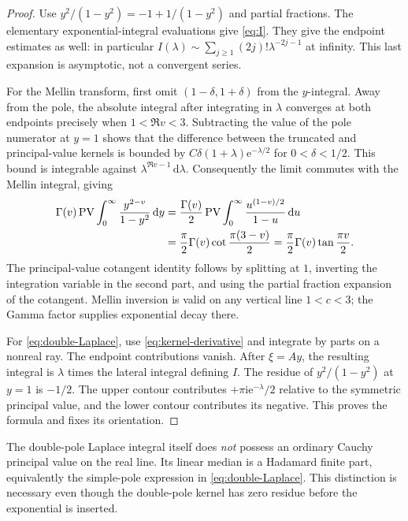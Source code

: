 \documentclass[11pt,a4paper]{article}
\numberwithin{equation}{section}
\theoremstyle{definition}\newtheorem{definition}[theorem]{Definition}
\theoremstyle{remark}\newtheorem{remark}[theorem]{Remark}
\newcommand{\ii}{\mathrm i}\newcommand{\e}{\mathrm e}
\newcommand{\dd}{\,\mathrm d}\newcommand{\Li}{\operatorname{Li}}
\begin{document}
\begin{proof}
Use $y^2/(1-y^2)=-1+1/(1-y^2)$ and partial fractions. The elementary
exponential-integral evaluations give \eqref{eq:I}. They give the
endpoint estimates as well: in particular
$I(\lambda)\sim\sum_{j\ge1}(2j)!\lambda^{-2j-1}$ at infinity.
This last expansion is asymptotic, not a convergent series.

For the Mellin transform, first omit $(1-\delta,1+\delta)$ from the
$y$-integral. Away from the pole, the absolute integral after integrating
in $\lambda$ converges at both endpoints precisely when
$1<\Re v<3$. Subtracting the value of the pole numerator at $y=1$
shows that the difference between the truncated and principal-value
kernels is bounded by
$C\delta(1+\lambda)\e^{-\lambda/2}$ for $0<\delta<1/2$.
This bound is integrable against $\lambda^{\Re v-1}\dd\lambda$.
Consequently the limit commutes with the Mellin integral, giving
\begin{align*}
 \Gamma(v)\PV\int_0^\infty\frac{y^{2-v}}{1-y^2}\dd y
 &=\frac{\Gamma(v)}2\PV\int_0^\infty\frac{u^{(1-v)/2}}{1-u}\dd u\\
 &=\frac\pi2\Gamma(v)\cot\frac{\pi(3-v)}2
  =\frac\pi2\Gamma(v)\tan\frac{\pi v}2.
\end{align*}
The principal-value cotangent identity follows by splitting at $1$,
inverting the integration variable in the second part, and using the
partial fraction expansion of the cotangent. Mellin inversion is
valid on any vertical line $1<c<3$; the Gamma factor supplies
exponential decay there.

For \eqref{eq:double-Laplace}, use \eqref{eq:kernel-derivative} and
integrate by parts on a nonreal ray. The endpoint contributions vanish.
After $\xi=Ay$, the resulting integral is $\lambda$ times the lateral
integral defining $I$. The residue of $y^2/(1-y^2)$ at $y=1$ is $-1/2$.
The upper contour contributes $+\pi\ii\e^{-\lambda}/2$ relative to
the symmetric principal value, and the lower contour contributes its
negative. This proves the formula and fixes its orientation.
\end{proof}

The double-pole Laplace integral itself does \emph{not} possess an
ordinary Cauchy principal value on the real line. Its linear median is
a Hadamard finite part, equivalently the simple-pole expression in
\eqref{eq:double-Laplace}. This distinction is necessary even though
the double-pole kernel has zero residue before the exponential is
inserted.
\end{document}
